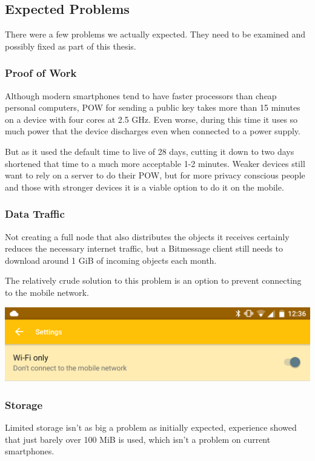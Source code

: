\documentclass{bfh}
\begin{document}
  \subsection{Expected Problems}
  There were a few problems we actually expected. They need to be examined and possibly fixed as part of this thesis.

  \subsubsection{Proof of Work}
  Although modern smartphones tend to have faster processors than cheap personal computers, \acf{POW} for sending a public key takes more than 15 minutes on a device with four cores at 2.5 GHz. Even worse, during this time it uses so much power that the device discharges even when connected to a power supply.

  But as it used the default time to live of 28 days, cutting it down to two days shortened that time to a much more acceptable 1-2 minutes. Weaker devices still want to rely on a server to do their \ac{POW}, but for more privacy conscious people and those with stronger devices it is a viable option to do it on the mobile.

  \subsubsection{Data Traffic}
  Not creating a full node that also distributes the objects it receives certainly reduces the necessary internet traffic, but a Bitmessage client still needs to download around 1 GiB of incoming objects each month.

  The relatively crude solution to this problem is an option to prevent connecting to the mobile network.

  \begin{center}
    \includegraphics[width=0.8 \textwidth]{images/screenshots/wifi_only_setting.png}
  \end{center}

  \subsubsection{Storage}
  Limited storage isn't as big a problem as initially expected, experience showed that just barely over 100 MiB is used, which isn't a problem on current smartphones.
\end{document}
